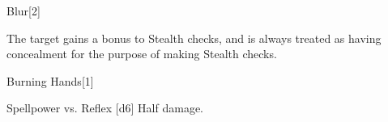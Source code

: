 \begin{spellsection}{Blur}[2]
    \begin{spellheader}
    \end{spellheader}
    \begin{spellcontent}
        \begin{spelltargetinginfo}
        \end{spelltargetinginfo}
        \begin{spelleffects}
            \spelleffect The target gains a  bonus to Stealth checks, and is always treated as having concealment for the purpose of making Stealth checks.
            \spelldur \durpersonallong
        \end{spelleffects}
    \end{spellcontent}
    \begin{spellfooter}
        \miscastrandom
    \end{spellfooter}
\end{spellsection}

\begin{spellsection}{Burning Hands}[1]
    \begin{spellheader}
    \end{spellheader}
    \begin{spellcontent}
        \begin{spelltargetinginfo}
        \end{spelltargetinginfo}
        \begin{spelleffects}
            \begin{spellattack}{Spellpower vs. Reflex}
                \spellsuccess {}[d6]
                \spellfailure Half damage.
            \end{spellattack}
        \end{spelleffects}
    \end{spellcontent}
    \begin{spellfooter}
        \miscastexplode
    \end{spellfooter}
\end{spellsection}

